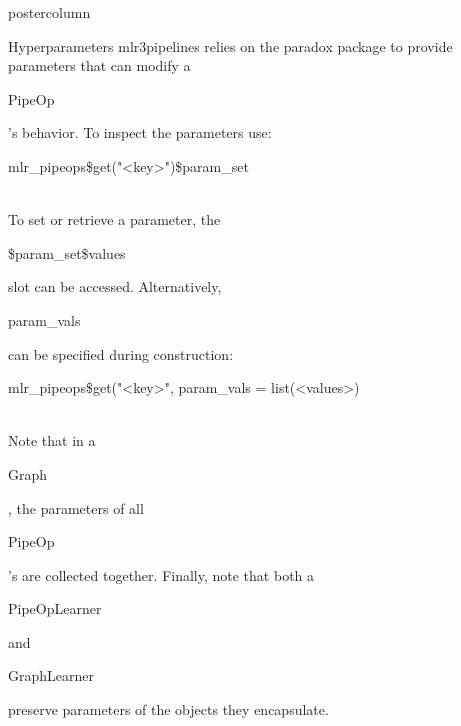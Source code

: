 \documentclass{beamer}
\newlength{\columnheight} %
\newcommand{\codeinline}[1]{\begin{codeboxinline}#1\end{codeboxinline}}
\begin{document}
\begin{frame}[fragile]{}
\begin{columns}
\begin{column}{.245\textwidth}
			\begin{beamercolorbox}[center]{postercolumn}
				\begin{minipage}{.98\textwidth}
					\parbox[t][\columnheight]{\textwidth}{
            \begin{myblock}{Hyperparameters}
              mlr3pipelines relies on the paradox package to provide parameters that can modify a \codeinline{PipeOp}'s behavior. To inspect the parameters use:
              \begin{codebox}
                mlr\_pipeops\$get("<key>")\$param\_set
              \end{codebox}
              \ \\
              To set or retrieve a parameter, the \codeinline{\$param\_set\$values} slot can be accessed. Alternatively, \codeinline{param\_vals} can be specified during construction:
              \begin{codebox}
                mlr\_pipeops\$get("<key>", param\_vals = list(<values>)
              \end{codebox}
              \ \\
              Note that in a \codeinline{Graph}, the parameters of all \codeinline{PipeOp}'s are collected together.
              Finally, note that both a \codeinline{PipeOpLearner} and \codeinline{GraphLearner} preserve parameters of the objects they encapsulate.
            \end{myblock}
						\vfill}
				\end{minipage}
			\end{beamercolorbox}
		\end{column}
	\end{columns}
\end{frame}
\end{document}
